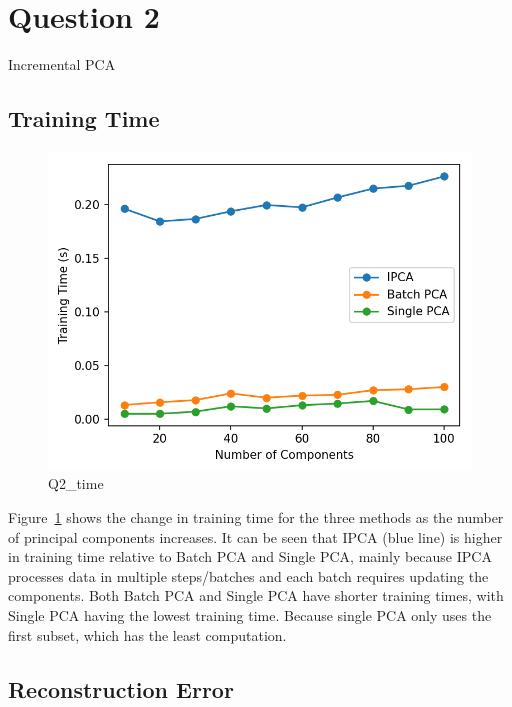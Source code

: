 \clearpage
\vspace{-2em}
\section{Question 2} Incremental PCA
\label{sec:Q2}

\subsection{Training Time}

\begin{figure}[h]
	\centering
	\includegraphics[width=0.8\linewidth]{Ressources/Q2_time.png}
	
	\caption{Q2\_time}
	\label{fig:Q2_time}
\end{figure}

Figure~\ref{fig:Q2_time} shows the change in training time for the three methods as the number of principal components increases. It can be seen that IPCA (blue line) is higher in training time relative to Batch PCA and Single PCA, mainly because IPCA processes data in multiple steps/batches and each batch requires updating the components. Both Batch PCA and Single PCA have shorter training times, with Single PCA having the lowest training time. Because single PCA only uses the first subset, which has the least computation.

\subsection{Reconstruction Error}

